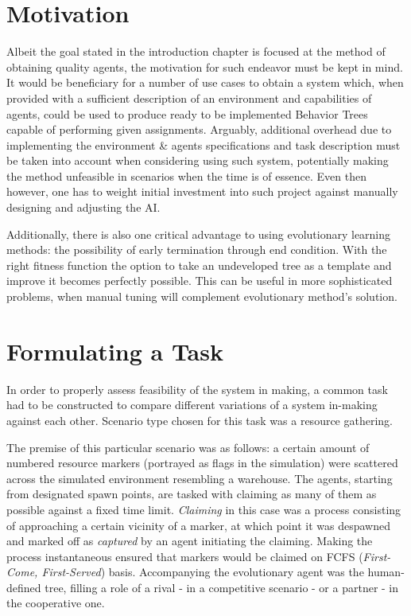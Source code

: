 \section{Motivation}
Albeit the goal stated in the introduction chapter is focused at the method of obtaining quality agents, the motivation for such endeavor must be kept in mind. It would be beneficiary for a number of use cases to obtain a system which, when provided with a sufficient description of an environment and capabilities of agents, could be used to produce ready to be implemented Behavior Trees capable of performing given assignments. Arguably, additional overhead due to implementing the environment \& agents specifications and task description must be taken into account when considering using such system, potentially making the method unfeasible in scenarios when the time is of essence. Even then however, one has to weight initial investment into such project against manually designing and adjusting the AI.

Additionally, there is also one critical advantage to using evolutionary learning methods: the possibility of early termination through end condition. With the right fitness function the option to take an undeveloped tree as a template and improve it becomes perfectly possible. This can be useful in more sophisticated problems, when manual tuning will complement evolutionary method's solution. %
\section{Formulating a Task}
In order to properly assess feasibility of the system in making, a common task had to be constructed to compare different variations of a system in-making against each other. Scenario type chosen for this task was a resource gathering.

The premise of this particular scenario was as follows: a certain amount of numbered resource markers (portrayed as flags in the simulation) were scattered across the simulated environment resembling a warehouse. The agents, starting from designated spawn points, are tasked with claiming as many of them as possible against a fixed time limit. \textit{Claiming} in this case was a process consisting of approaching a certain vicinity of a marker, at which point it was despawned and marked off as \textit{captured} by an agent initiating the claiming. Making the process instantaneous ensured that markers would be claimed on FCFS (\textit{First-Come, First-Served}) basis. Accompanying the evolutionary agent was the human-defined tree, filling a role of a rival - in a competitive scenario - or a partner - in the cooperative one.

